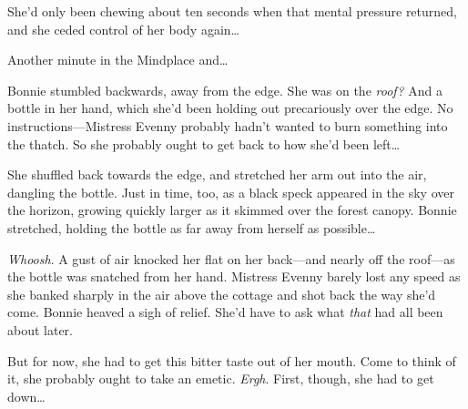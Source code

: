 She'd only been chewing about ten seconds when that mental pressure returned, and she ceded control of her body again{\dots}


Another minute in the Mindplace and{\dots}


Bonnie stumbled backwards, away from the edge.
She was on the \emph{roof?}
And a bottle in her hand, which she'd been holding out precariously over the edge.
No instructions---Mistress Evenny probably hadn't wanted to burn something into the thatch.
So she probably ought to get back to how she'd been left{\dots}

She shuffled back towards the edge, and stretched her arm out into the air, dangling the bottle.
Just in time, too, as a black speck appeared in the sky over the horizon, growing quickly larger as it skimmed over the forest canopy.
Bonnie stretched, holding the bottle as far away from herself as possible{\dots}

\emph{Whoosh}.
A gust of air knocked her flat on her back---and nearly off the roof---as the bottle was snatched from her hand.
Mistress Evenny barely lost any speed as she banked sharply in the air above the cottage and shot back the way she'd come.
Bonnie heaved a sigh of relief.
She'd have to ask what \emph{that} had all been about later.

But for now, she had to get this bitter taste out of her mouth.
Come to think of it, she probably ought to take an emetic.
\emph{Ergh}.
First, though, she had to get down{\dots}

